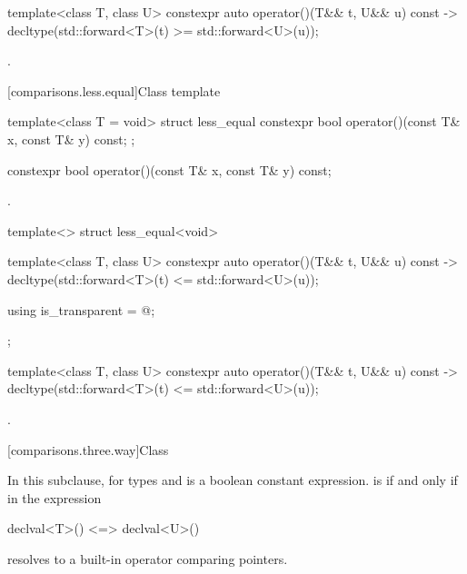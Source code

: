 %
\begin{itemdecl}
template<class T, class U> constexpr auto operator()(T&& t, U&& u) const
    -> decltype(std::forward<T>(t) >= std::forward<U>(u));
\end{itemdecl}

\begin{itemdescr}
\pnum
\returns
{}.
\end{itemdescr}

[comparisons.less.equal]{Class template }

%
\begin{itemdecl}
template<class T = void> struct less_equal {
  constexpr bool operator()(const T& x, const T& y) const;
};
\end{itemdecl}

%
\begin{itemdecl}
constexpr bool operator()(const T& x, const T& y) const;
\end{itemdecl}

\begin{itemdescr}
\pnum
\returns
{}.
\end{itemdescr}

%
\begin{itemdecl}
template<> struct less_equal<void> {
  template<class T, class U> constexpr auto operator()(T&& t, U&& u) const
    -> decltype(std::forward<T>(t) <= std::forward<U>(u));

  using is_transparent = @\unspec@;
};
\end{itemdecl}

%
\begin{itemdecl}
template<class T, class U> constexpr auto operator()(T&& t, U&& u) const
    -> decltype(std::forward<T>(t) <= std::forward<U>(u));
\end{itemdecl}

\begin{itemdescr}
\pnum
\returns
{}.
\end{itemdescr}

[comparisons.three.way]{Class }

\pnum
In this subclause, 
for types  and  is a boolean constant expression.
 is 
if and only if \tcode{<=>} in the expression
\begin{codeblock}
declval<T>() <=> declval<U>()
\end{codeblock}
resolves to a built-in operator comparing pointers.

